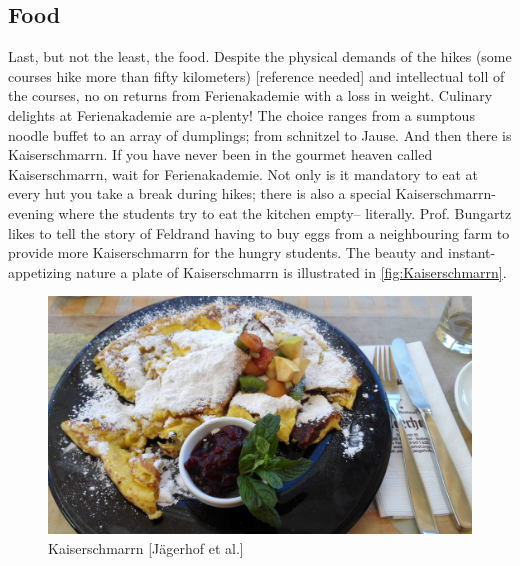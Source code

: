 \subsection{Food}
Last, but not the least, the food. Despite the physical demands of the hikes (some courses hike more than fifty kilometers) [reference needed] and intellectual toll of the courses, no on returns from Ferienakademie with a loss in weight. Culinary delights at Ferienakademie are a-plenty! The choice ranges from a sumptous noodle buffet to an array of dumplings; from schnitzel to Jause. And then there is Kaiserschmarrn. If you have never been in the gourmet heaven called Kaiserschmarrn, wait for Ferienakademie. Not only is it mandatory to eat at every hut you take a break during hikes; there is also a special Kaiserschmarrn-evening where the students try to eat the kitchen empty-- literally. Prof. Bungartz likes to tell the story of Feldrand having to buy eggs from a neighbouring farm to provide more Kaiserschmarrn for the hungry students. The beauty and instant-appetizing nature a plate of Kaiserschmarrn is illustrated in \autoref{fig:Kaiserschmarrn}.
\begin{figure}[ht]%
 	\begin{center}%
 		\includegraphics[scale=0.05]{img/Kaiserschmarrn.jpg}%
 		\caption{Kaiserschmarrn [Jägerhof et al.]}\label{fig:Kaiserschmarrn}%
 	\end{center}%
\end{figure}

